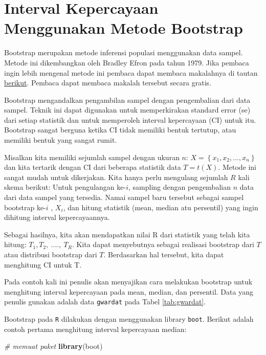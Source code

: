 \documentclass[]{book}
\newenvironment{Shaded}{\begin{snugshade}}{\end{snugshade}}
\newcommand{\KeywordTok}[1]{\textcolor[rgb]{0.13,0.29,0.53}{\textbf{#1}}}
\newcommand{\CommentTok}[1]{\textcolor[rgb]{0.56,0.35,0.01}{\textit{#1}}}
\newcommand{\NormalTok}[1]{#1}
\begin{document}
\section{Interval Kepercayaan Menggunakan Metode
Bootstrap}\label{interval-kepercayaan-menggunakan-metode-bootstrap}

Bootstrap merupakan metode inferensi populasi menggunakan data sampel.
Metode ini dikembangkan oleh Bradley Efron pada tahun 1979. Jika pembaca
ingin lebih mengenal metode ini pembaca dapat membaca makalahnya di
tautan \href{https://projecteuclid.org/euclid.aos/1176344552}{berikut}.
Pembaca dapat membaca makalah tersebut secara gratis.

Bootstrap mengandalkan pengambilan sampel dengan pengembalian dari data
sampel. Teknik ini dapat digunakan untuk memperkirakan standard error
(se) dari setiap statistik dan untuk memperoleh interval kepercayaan
(CI) untuk itu. Bootstrap sangat berguna ketika CI tidak memiliki bentuk
tertutup, atau memiliki bentuk yang sangat rumit.

Misalkan kita memiliki sejumlah sampel dengan ukuran \(n\):
\(X=\left\{x_1,x_2,...,x_n\right\}\) dan kita tertarik dengan CI dari
beberapa statistik data \(T=t\left(X\right)\). Metode ini sangat mudah
untuk dikerjakan. Kita hanya perlu mengulang sejumlah \(R\) kali skema
berikut: Untuk pengulangan ke-\(i\), sampling dengan pengembalian \(n\)
data dari data sampel yang tersedia. Namai sampel baru tersebut sebagai
sampel bootstrap ke-\(i\) , \(X_i\), dan hitung statistik (mean, median
atu persentil) yang ingin dihitung interval kepercayaannya.

Sebagai hasilnya, kita akan mendapatkan nilai R dari statistik yang
telah kita hitung: \(T_1,T_2,\ ....,\ T_R\). Kita dapat menyebutnya
sebagai realisasi bootstrap dari \(T\) atau distribusi bootstrap dari
\(T\). Berdasarkan hal tersebut, kita dapat menghitung CI untuk T.

Pada contoh kali ini penulis akan menyajikan cara melakukan bootstrap
untuk menghitung interval kepercayaan pada mean, median, dan persentil.
Data yang penulis gunakan adalah data \texttt{gwardat} pada Tabel
\ref{tab:gwardat}.

Bootstrap pada \texttt{R} dilakukan dengan menggunakan library
\texttt{boot}. Berikut adalah contoh pertama menghitung interval
kepercayaan median:

\begin{Shaded}
\begin{Highlighting}[]
\CommentTok{# memuat paket}
\KeywordTok{library}\NormalTok{(boot)}
\end{Highlighting}
\end{Shaded}
\end{document}
